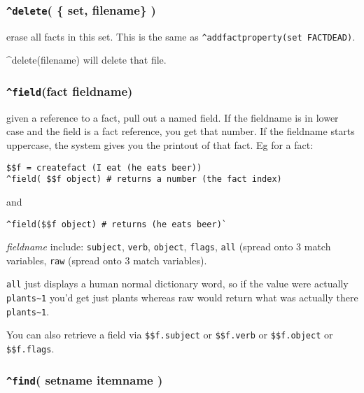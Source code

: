 \documentclass[]{article}
\begin{document}
\subsubsection{\texorpdfstring{\texttt{\^{}delete}( \{ set, filename\}
)}{\^{}delete( \{ set, filename\} )}}\label{delete-set-filename}

erase all facts in this set. This is the same as
\texttt{\^{}addfactproperty(set\ FACTDEAD)}.

\^{}delete(filename) will delete that file.

\subsubsection{\texorpdfstring{\texttt{\^{}field}(fact
fieldname)}{\^{}field(fact fieldname)}}\label{fieldfact-fieldname}

given a reference to a fact, pull out a named field. If the fieldname is
in lower case and the field is a fact reference, you get that number. If
the fieldname starts uppercase, the system gives you the printout of
that fact. Eg for a fact:

\begin{verbatim}
$$f = createfact (I eat (he eats beer))
^field( $$f object) # returns a number (the fact index)
\end{verbatim}

and

\begin{verbatim}
^field($$f object) # returns (he eats beer)`
\end{verbatim}

\emph{fieldname} include: \texttt{subject}, \texttt{verb},
\texttt{object}, \texttt{flags}, \texttt{all} (spread onto 3 match
variables, \texttt{raw} (spread onto 3 match variables).

\texttt{all} just displays a human normal dictionary word, so if the
value were actually \texttt{plants\textasciitilde{}1} you'd get just
plants whereas raw would return what was actually there
\texttt{plants\textasciitilde{}1}.

You can also retrieve a field via \texttt{\$\$f.subject} or
\texttt{\$\$f.verb} or \texttt{\$\$f.object} or \texttt{\$\$f.flags}.

\subsubsection{\texorpdfstring{\texttt{\^{}find}( setname itemname
)}{\^{}find( setname itemname )}}\label{find-setname-itemname}
\end{document}
